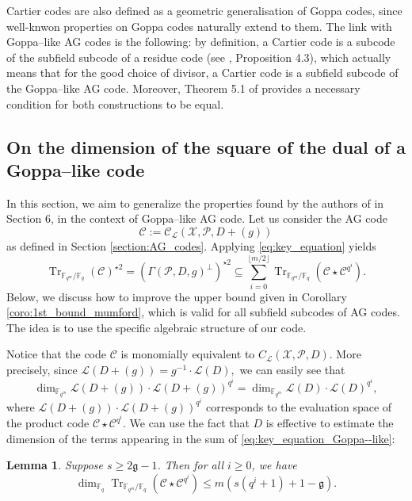\documentclass[a4paper]{article}
\newtheorem{lemma}[thm]{Lemma}
\theoremstyle{definition}
\theoremstyle{remark}
\newcommand{\calP}{\mathcal{P}}
\newcommand{\calL}{\mathcal{L}}
\newcommand{\calC}{\mathcal{C}}
\newcommand{\calX}{\mathcal{X}}
\newcommand{\fqm}{\mathbb{F}_{q^m}}
\newcommand{\fq}{\mathbb{F}_{q}}
\newcommand{\Tr}[1]{\operatorname{Tr}_{\mathbb{F}_{q^m}/\fq}\left(#1\right)}
\begin{document}
Cartier codes \cite{Cou14} are also defined as a geometric generalisation of Goppa codes, since well-knwon properties on Goppa codes naturally extend to them.
The link with Goppa--like AG codes is the following: by definition, a Cartier code is a subcode of the subfield subcode of a residue code (see \cite{Cou14}, Proposition 4.3), which actually means that for the good choice of divisor, a Cartier code is a subfield subcode of the Goppa--like AG code. Moreover, Theorem 5.1 of \cite{Cou14} provides a necessary condition for both constructions to be equal.



\subsection{On the dimension of the square of the dual of a Goppa--like code}

In this section, we aim to generalize the properties found by the authors of \cite{MT21} in Section 6, in the context of Goppa--like AG code. Let us consider the AG code 
$$\calC := \calC_{\calL}(\calX,\calP,D+(g))$$
as defined in Section \ref{section:AG_codes}. Applying \eqref{eq:key_equation} yields   
\begin{equation} \label{eq:key_equation_Goppa--like} 
\Tr{\calC}^{\star 2} = (\Gamma(\calP,D,g)^{\perp})^{\star2} \subseteq \sum\limits_{i=0}^{\lfloor{m/2} \rfloor} \Tr{\calC\star \calC^{q^i}}.
\end{equation}
Below, we discuss how to improve the upper bound given in Corollary \ref{coro:1st_bound_mumford}, which is valid for all subfield subcodes of AG codes. The idea is to use the specific algebraic structure of our code.

\noindent Notice that the code $\calC$ is monomially equivalent to $C_{\calL}(\calX,\calP,D)$. 
More precisely, since $\calL(D+(g)) = g^{-1} \cdot \calL(D),$
we can easily see that
\begin{equation} \label{eq:equiv_divisors}
\dim_{\fqm} \calL(D+(g))\cdot \calL(D+(g))^{q^i} = \dim_{\fqm} \calL(D)\cdot \calL(D)^{q^i},
\end{equation}
where $\calL(D+(g))\cdot \calL(D+(g))^{q^i}$ corresponds to the evaluation space of the product code $\calC \star \calC^{q^i}$. We can use the fact that $D$ is effective to estimate the dimension of the terms appearing in the sum of \eqref{eq:key_equation_Goppa--like}:


\begin{lemma} \label{lem:bound_dim_Tr(C*C^q^i)}
  Suppose $s \geq 2\mathfrak{g}-1$. Then for all $i \geq 0$, we have 
   $$\dim_{\fq} \Tr{\calC\star \calC^{q^i}} \leq m\left(s\left(q^i+1\right)+1-\mathfrak{g}\right).$$
\end{lemma}
\end{document}
